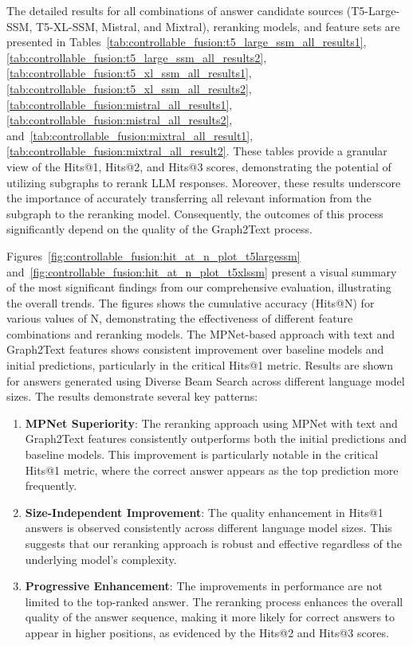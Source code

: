 The detailed results for all combinations of answer candidate sources (T5-Large-SSM, T5-XL-SSM, Mistral, and Mixtral), reranking models, and feature sets are presented in Tables~\ref{tab:controllable_fusion:t5_large_ssm_all_results1}, \ref{tab:controllable_fusion:t5_large_ssm_all_results2}, \ref{tab:controllable_fusion:t5_xl_ssm_all_results1}, \ref{tab:controllable_fusion:t5_xl_ssm_all_results2}, \ref{tab:controllable_fusion:mistral_all_results1}, \ref{tab:controllable_fusion:mistral_all_results2}, and~\ref{tab:controllable_fusion:mixtral_all_result1}, \ref{tab:controllable_fusion:mixtral_all_result2}. These tables provide a granular view of the Hits@1, Hits@2, and Hits@3 scores, demonstrating the potential of utilizing subgraphs to rerank LLM responses. Moreover, these results underscore the importance of accurately transferring all relevant information from the subgraph to the reranking model. Consequently, the outcomes of this process significantly depend on the quality of the Graph2Text process.

Figures~\ref{fig:controllable_fusion:hit_at_n_plot_t5largessm} and~\ref{fig:controllable_fusion:hit_at_n_plot_t5xlssm} present a visual summary of the most significant findings from our comprehensive evaluation, illustrating the overall trends. The figures shows the cumulative accuracy (Hits@N) for various values of N, demonstrating the effectiveness of different feature combinations and reranking models. The MPNet-based approach with text and Graph2Text features shows consistent improvement over baseline models and initial predictions, particularly in the critical Hits@1 metric. Results are shown for answers generated using Diverse Beam Search across different language model sizes. The results demonstrate several key patterns:

\begin{enumerate}
    \item \textbf{MPNet Superiority}: The reranking approach using MPNet with text and Graph2Text features consistently outperforms both the initial predictions and baseline models. This improvement is particularly notable in the critical Hits@1 metric, where the correct answer appears as the top prediction more frequently.
    
    \item \textbf{Size-Independent Improvement}: The quality enhancement in Hits@1 answers is observed consistently across different language model sizes. This suggests that our reranking approach is robust and effective regardless of the underlying model's complexity.
    
    \item \textbf{Progressive Enhancement}: The improvements in performance are not limited to the top-ranked answer. The reranking process enhances the overall quality of the answer sequence, making it more likely for correct answers to appear in higher positions, as evidenced by the Hits@2 and Hits@3 scores.
\end{enumerate}

